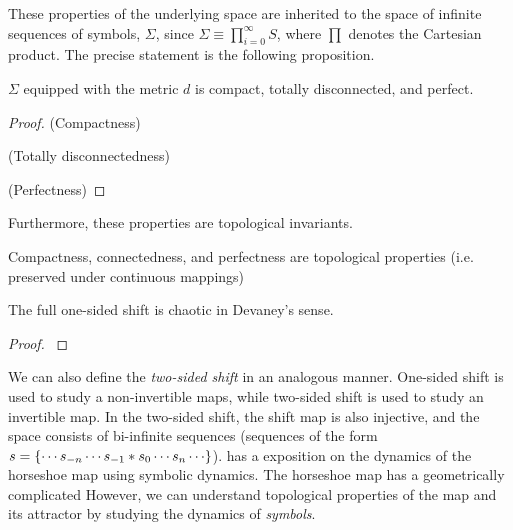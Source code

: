 \documentclass[10pt,twoside]{book}
\begin{document}
These properties of the underlying space are inherited to the space of infinite sequences of symbols, $\Sigma$, since $\Sigma \equiv \prod\limits_{i = 0}^{\infty} S$, where $\prod$ denotes the Cartesian product.
The precise statement is the following proposition.
\begin{proposition}
  $\Sigma$ equipped with the metric $d$ is compact, totally disconnected, and perfect.
  \begin{proof}
    (Compactness)

    (Totally disconnectedness)

    (Perfectness)

  \end{proof}
\end{proposition}
Furthermore, these properties are topological invariants.
\begin{proposition}
  Compactness, connectedness, and perfectness are topological properties (i.e. preserved under continuous mappings)
\end{proposition}

\begin{theorem}
  The full one-sided shift is chaotic in Devaney's sense.
  \begin{proof}
    \citep{sternberg}
  \end{proof}
\end{theorem}

We can also define the \textit{two-sided shift} in an analogous manner.
One-sided shift is used to study a non-invertible maps, while two-sided shift is used to study an invertible map.
In the two-sided shift, the shift map is also injective, and the space consists of bi-infinite sequences (sequences of the form $s = \set{ \cdots s_{-n} \cdots s_{-1} * s_0 \cdots s_n \cdots }$).
\citet{wiggins} has a exposition on the dynamics of the horseshoe map using symbolic dynamics.
The horseshoe map has a geometrically complicated 
However, we can understand topological properties of the map and its attractor by studying the dynamics of \textit{symbols}.
\end{document}
